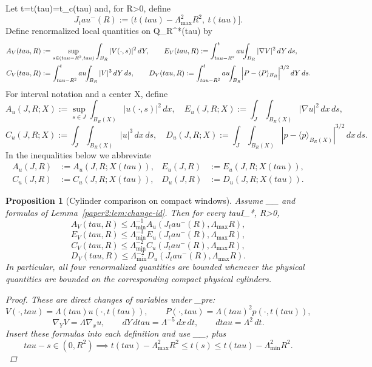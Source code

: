 \documentclass[11pt]{amsart}
\def\({}%
\def\){}%
\def\tau{tau}%
\theoremstyle{plain}
\newtheorem{proposition}[theorem]{Proposition}
\theoremstyle{definition}
\theoremstyle{remark}
\begin{document}
Let \(t=t(\tau)=t_{\rm c}(\tau)\) and, for \(R>0\), define
\[
J_\tau^{-}(R):=\bigl(t(\tau)-\Lambda_{\max}^{2}R^2,\ t(\tau)\bigr].
\]
Define renormalized local quantities on \(Q_R^*(\tau)\) by
\[
\begin{aligned}
A_V(\tau,R)&:=\sup_{s\in(\tau-R^2,\tau)}\int_{B_R}|V(\cdot,s)|^2\,dY,\qquad
E_V(\tau,R):=\int_{\tau-R^2}^\tau\!\!\int_{B_R}|\nabla V|^2\,dY\,d s,\\
C_V(\tau,R)&:=\int_{\tau-R^2}^\tau\!\!\int_{B_R}|V|^3\,dY\,d s,\qquad
D_V(\tau,R):=\int_{\tau-R^2}^\tau\!\!\int_{B_R}\Bigl|P-\langle P\rangle_{B_R}\Bigr|^{3/2}\,dY\,d s.
\end{aligned}
\]
For interval notation and a center \(X\), define
\[
A_u(J,R;X):=\sup_{s\in J}\int_{B_R(X)}|u(\cdot,s)|^2\,dx,\quad
E_u(J,R;X):=\int_J\int_{B_R(X)}|\nabla u|^2\,dx\,ds,
\]
\[
C_u(J,R;X):=\int_J\int_{B_R(X)}|u|^3\,dx\,ds,\quad
D_u(J,R;X):=\int_J\int_{B_R(X)}|p-\langle p\rangle_{B_R(X)}|^{3/2}\,dx\,ds.
\]
In the inequalities below we abbreviate
\[
\begin{aligned}
A_u(J,R)&:=A_u(J,R;X(\tau)),& E_u(J,R)&:=E_u(J,R;X(\tau)),\\
C_u(J,R)&:=C_u(J,R;X(\tau)),& D_u(J,R)&:=D_u(J,R;X(\tau)).
\end{aligned}
\]

\begin{proposition}[Cylinder comparison on compact windows]\label{paper2:prop:local-transfer}
Assume \(\Lambda_{\min}\le \Lambda\le \Lambda_{\max}\) and formulas of
Lemma~\ref{paper2:lem:change-id}.
Then for every \(\tau\in I_*\), \(R>0\),
\[
A_V(\tau,R)\le \Lambda_{\min}^{-1}A_u(J_\tau^{-}(R),\Lambda_{\max}R),
\]
\[
E_V(\tau,R)\le \Lambda_{\min}^{-3}E_u(J_\tau^{-}(R),\Lambda_{\max}R),
\]
\[
C_V(\tau,R)\le \Lambda_{\min}^{-2}C_u(J_\tau^{-}(R),\Lambda_{\max}R),
\]
\[
D_V(\tau,R)\le \Lambda_{\min}^{-2}D_u(J_\tau^{-}(R),\Lambda_{\max}R).
\]
In particular, all four renormalized quantities are bounded whenever the physical
quantities are bounded on the corresponding compact physical cylinders.
\begin{proof}
These are direct changes of variables under \(\Phi_{\rm pre}\):
\[
V(\cdot,\tau)=\Lambda(\tau)u(\cdot,t(\tau)),\qquad
P(\cdot,\tau)=\Lambda(\tau)^2 p(\cdot,t(\tau)),
\]
\[
\nabla_YV=\Lambda\nabla_xu,\qquad dY\,d\tau=\Lambda^{-5}\,dx\,dt,\qquad
d\tau=\Lambda^{2}\,dt.
\]
Insert these formulas into each definition and use
\(\Lambda_{\min}\le\Lambda\le\Lambda_{\max}\), plus
\[
\tau-s\in(0,R^2)\implies t(\tau)-\Lambda_{\max}^{2}R^2\le t(s)\le t(\tau)-\Lambda_{\min}^{2}R^2.
\]
\end{proof}
\end{proposition}
\end{document}
